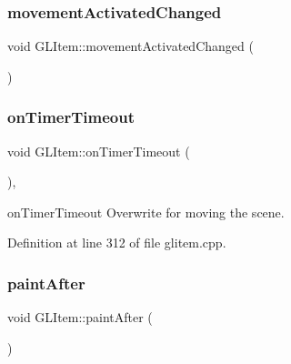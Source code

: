 \mbox{\label{class_g_l_item_a2090aebc920ce93976316b9d43a44839}} 
\subsubsection{\texorpdfstring{movementActivatedChanged}{movementActivatedChanged}}
{\footnotesize\ttfamily void G\+L\+Item\+::movement\+Activated\+Changed (\begin{DoxyParamCaption}{ }\end{DoxyParamCaption})\hspace{0.3cm}{\ttfamily [signal]}}

\mbox{\label{class_g_l_item_acc7a813e42fb63bc6b7f2cf680b62717}} 
\subsubsection{\texorpdfstring{onTimerTimeout}{onTimerTimeout}}
{\footnotesize\ttfamily void G\+L\+Item\+::on\+Timer\+Timeout (\begin{DoxyParamCaption}{ }\end{DoxyParamCaption})\hspace{0.3cm}{\ttfamily [protected]}, {\ttfamily [slot]}}



on\+Timer\+Timeout Overwrite for moving the scene. 



Definition at line 312 of file glitem.\+cpp.

\mbox{\label{class_g_l_item_a146bd63e186b55cbd6ed192706773a24}} 
\subsubsection{\texorpdfstring{paintAfter}{paintAfter}}
{\footnotesize\ttfamily void G\+L\+Item\+::paint\+After (\begin{DoxyParamCaption}{ }\end{DoxyParamCaption})\hspace{0.3cm}{\ttfamily [slot]}}



